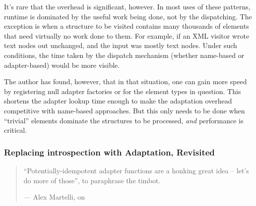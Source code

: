 \begin{verbatim%
}
\begin{verbatim%
}
\begin{verbatim%
}
\begin{verbatim%
}
\begin{verbatim%
}
\begin{verbatim%
}
\begin{verbatim%
}
\begin{verbatim%
}
\begin{verbatim%
}
\begin{verbatim%
}
\begin{verbatim%
}
\begin{verbatim%
}
\begin{verbatim%
}
\begin{verbatim%
}
It's rare that the overhead is significant, however.  In most uses of these
patterns, runtime is dominated by the useful work being done, not by the
dispatching.  The exception is when a structure to be visited contains many
thousands of elements that need virtually no work done to them.  For example,
if an XML visitor wrote text nodes out unchanged, and the input was mostly text
nodes.  Under such conditions, the time taken by the dispatch mechanism (whether
name-based or adapter-based) would be more visible.

The author has found, however, that in that situation, one can gain more speed
by registering null adapter factories or  for the
element types in question.  This shortens the adapter lookup time enough to make
the adaptation overhead competitive with name-based approaches.  But this only
needs to be done when ``trivial'' elements dominate the structures to be
processed, \emph{and} performance is critical.

\begin{seealso}

\end{seealso}

\newpage
\subsubsection{Replacing introspection with Adaptation, Revisited\label{introspect-elim}}

\begin{quotation}
``Potentially-idempotent adapter functions are a honking great
idea -- let's do more of those'', to paraphrase the timbot.

\hfill --- Alex Martelli, on 
\end{quotation}


\end{verbatim%
}
\end{verbatim%
}
\end{verbatim%
}
\end{verbatim%
}
\end{verbatim%
}
\end{verbatim%
}
\end{verbatim%
}
\end{verbatim%
}
\end{verbatim%
}
\end{verbatim%
}
\end{verbatim%
}
\end{verbatim%
}
\end{verbatim%
}
\end{verbatim%
}
